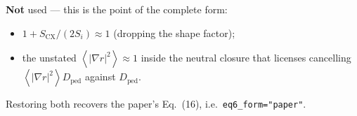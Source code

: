 \documentclass[11pt]{article}
\newcommand{\Si}{S_{i}}
\newcommand{\Scx}{S_{\mathrm{CX}}}
\newcommand{\Dped}{D_{\mathrm{ped}}}
\newcommand{\fsa}[1]{\left\langle #1 \right\rangle}
\newcommand{\gradrsq}{\fsa{|\nabla r|^{2}}}
\begin{document}
\textbf{Not} used --- this is the point of the complete form:
\begin{itemize}
  \item[\textbf{A5}] $1+\Scx/(2\Si)\approx1$ (dropping the shape factor);
  \item[] the unstated $\gradrsq\approx1$ inside the neutral closure that
        licenses cancelling $\gradrsq\Dped$ against $\Dped$.
\end{itemize}
Restoring both recovers the paper's Eq.~(16), i.e.\
\texttt{eq6\_form="paper"}.
\end{document}

